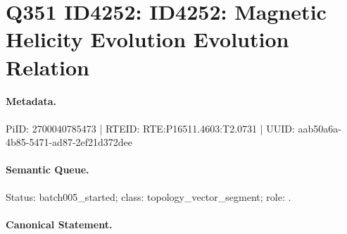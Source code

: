 \section*{Q351 ID4252: ID4252: Magnetic Helicity Evolution Evolution Relation}
\paragraph{Metadata.}
PiID: 2700040785473 | RTEID: RTE:P16511.4603:T2.0731 | UUID: aab50a6a-4b85-5471-ad87-2ef21d372dee

\paragraph{Semantic Queue.}
Status: batch005\_started; class: topology\_vector\_segment; role: .

\paragraph{Canonical Statement.}

